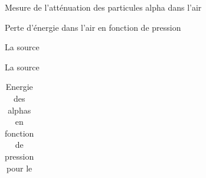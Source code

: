 \documentclass[a4paper,11pt]{scrartcl}
\begin{document}
\begin{section}{Mesure de l'atténuation des particules alpha dans l'air}
\begin{subsection}{Perte d'énergie dans l'air en fonction de pression}
   \begin{subsubsection}{La source }
    
   \end{subsubsection}
  
   \begin{subsubsection}{La source }
    
   \end{subsubsection}


    
   \begin{table}[H]
    \caption{Energie des alphas en fonction de pression pour le }
    \begin{center}
     \begin{tabular}{c|c|c|c|c|c|c|c}


\end{tabular}
\end{center}
\end{table}
\end{subsection}
\end{section}
\end{document}
